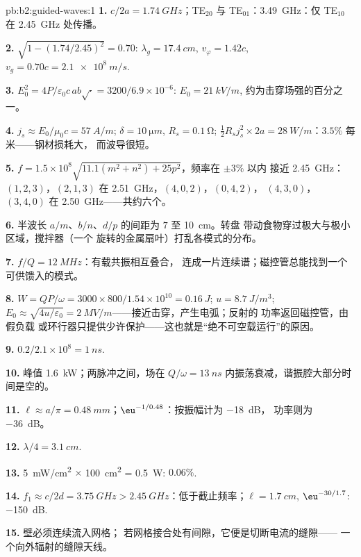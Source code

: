 \begin{solution}{pb:b2:guided-waves:1}
\textbf{1.} $c/2a = \qty{1.74}{GHz}$；TE$_{20}$ 与 TE$_{01}$：\qty{3.49}{GHz}：仅
TE$_{10}$ 在 \qty{2.45}{GHz} 处传播。

\textbf{2.} $\sqrt{1 - (1.74/2.45)^2} = 0.70$: $\lambda_g = \qty{17.4}{cm}$, $v_\varphi = 1.42c$,
$v_g = 0.70c = \qty{2.1e8}{m/s}$.

\textbf{3.} $E_0^2 = 4P/\varepsilon_0c\,ab\sqrt{\cdot} = 3200/6.9 \times 10^{-6}$: $E_0 = \qty{21}{kV/m}$,
约为击穿场强的百分之一。

\textbf{4.} $j_s \approx E_0/\mu_0c = \qty{57}{A/m}$; $\delta = \qty{10}{\micro m}$, $R_s = \qty{0.1}{\ohm}$;
$\tfrac12R_sj_s^2 \times 2a = \qty{28}{W/m}$：$3.5\%$ 每米——钢材损耗大，
而波导很短。

\textbf{5.} $f = 1.5 \times 10^8\sqrt{11.1(m^2 + n^2) + 25p^2}$，频率在 $\pm3\%$ 以内
接近 \qty{2.45}{GHz}：$(1, 2, 3)$，$(2, 1, 3)$ 在 \qty{2.51}{GHz}，$(4, 0, 2)$，$(0, 4, 2)$，
$(4, 3, 0)$，$(3, 4, 0)$ 在 \qty{2.50}{GHz}——共约六个。

\textbf{6.} 半波长 $a/m$、$b/n$、$d/p$ 的间距为 $7$ 至 \qty{10}{cm}。转盘
带动食物穿过极大与极小区域，搅拌器（一个
旋转的金属扇叶）打乱各模式的分布。

\textbf{7.} $f/Q = \qty{12}{MHz}$：有载共振相互叠合，
连成一片连续谱；磁控管总能找到一个可供馈入的模式。

\textbf{8.} $W = QP/\omega = 3000 \times 800/1.54 \times 10^{10} = \qty{0.16}{J}$; $u = \qty{8.7}{J/m^3}$;
$E_0 \approx \sqrt{4u/\varepsilon_0} = \qty{2}{MV/m}$——接近击穿，产生电弧；反射的
功率返回磁控管，由假负载
或环行器只提供少许保护——这也就是“绝不可空载运行”的原因。

\textbf{9.} $0.2/2.1 \times 10^8 = \qty{1}{ns}$.

\textbf{10.} 峰值 \qty{1.6}{kW}；两脉冲之间，场在
$Q/\omega = \qty{13}{ns}$ 内振荡衰减，谐振腔大部分时间是空的。

\textbf{11.} $\ell \approx a/\pi = \qty{0.48}{mm}$；$\eu^{-1/0.48}$：按振幅计为 \qty{-18}{dB}，
功率则为 \qty{-36}{dB}。

\textbf{12.} $\lambda/4 = \qty{3.1}{cm}$.

\textbf{13.} \qty{5}{mW/cm^2} $\times$ \qty{100}{cm^2} = \qty{0.5}{W}: $0.06\%$.

\textbf{14.} $f_1 \approx c/2d = \qty{3.75}{GHz} > \qty{2.45}{GHz}$：低于截止频率；$\ell =
\qty{1.7}{cm}$, $\eu^{-30/1.7}$: \qty{-150}{dB}.

\textbf{15.} 壁必须连续流入网格；
若网格接合处有间隙，它便是切断电流的缝隙——
一个向外辐射的缝隙天线。


\end{solution}

